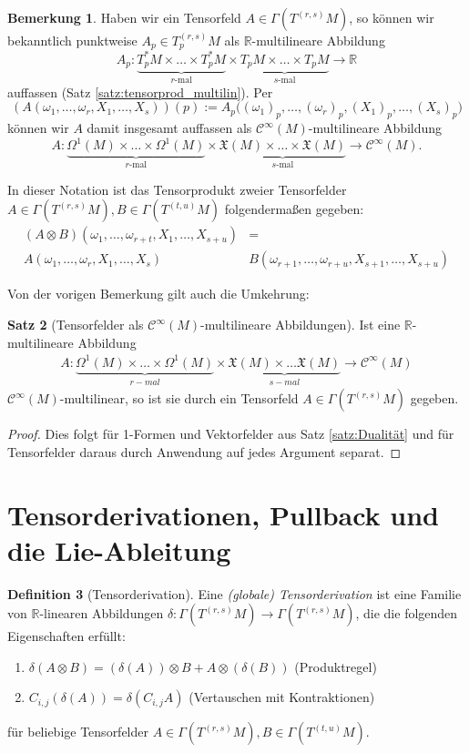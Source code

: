 \documentclass[a4paper]{scrbook}
\numberwithin{equation}{chapter}
\newcommand{\R}{\mathbb{R}}
\newcommand{\sC}{\mathcal{C}^{\infty}}
\newcommand{\vf}{\mathfrak{X}}
\theoremstyle{definition}
\newtheorem{defn}{Definition}[section]
\newtheorem{satz}[defn]{Satz}
\newtheorem{bem}[defn]{Bemerkung}
\begin{document}
		\begin{bem}\label{bem:Tensorprodukt_mulitilin}
			Haben wir ein Tensorfeld $A \in \Gamma(T^{(r,s)}M)$, so können wir bekanntlich punktweise $A_p \in T^{(r,s)}_pM$ als $\R$-multilineare Abbildung
			\[A_p\colon \underbrace{T_p^*M \times \dots \times T_p^*M}_\text{$r$-mal} \times \underbrace{T_pM \times \dots \times T_pM}_\text{$s$-mal} \to \R\]
			auffassen (Satz \ref{satz:tensorprod_multilin}). Per
			\[(A(\omega_1,\dots,\omega_r, X_1,\dots,X_s))(p) := A_p\Big((\omega_1)_p,\dots,(\omega_r)_p, (X_1)_p,\dots,(X_s)_p\Big)\]
			können wir $A$ damit insgesamt auffassen als $\sC(M)$-multilineare Abbildung
			\[A\colon \underbrace{\Omega^1(M) \times \dots \times \Omega^1(M)}_\text{$r$-mal} \times \underbrace{\vf(M) \times \dots \times \vf(M)}_\text{$s$-mal} \to \sC(M).\]
			
			In dieser Notation ist das Tensorprodukt zweier Tensorfelder $A\in\Gamma(T^{(r,s)}M), B\in \Gamma(T^{(t,u)}M)$ folgendermaßen gegeben:
			\begin{align*}
				(A\otimes B)(\omega_1,\ldots,\omega_{r+t},X_1,\ldots,X_{s+u})&=\\
				A(\omega_1,\ldots,\omega_r,X_1,\ldots,X_s) &B(\omega_{r+1},\ldots,\omega_{r+u},X_{s+1},\ldots,X_{s+u})
			\end{align*}
		\end{bem}
		Von der vorigen Bemerkung gilt auch die Umkehrung:
		\begin{satz}[Tensorfelder als $\sC(M)$-multilineare Abbildungen]
			Ist eine $\R$-multilineare Abbildung
			\begin{align*}
				A\colon \underbrace{\Omega^1(M)\times\dots\times\Omega^1(M)}_{r-mal}\times\underbrace{\vf(M)\times\dots\vf(M)}_{s-mal}\rightarrow \sC(M)
			\end{align*}
			$\sC(M)$-multilinear, so ist sie durch ein Tensorfeld $A \in \Gamma(T^{(r,s)}M)$ gegeben.
			\begin{proof}
				Dies folgt für 1-Formen und Vektorfelder aus Satz \ref{satz:Dualität} und für Tensorfelder daraus durch Anwendung \glqq auf jedes Argument separat\grqq .
			\end{proof}
		\end{satz}

	\section{Tensorderivationen, Pullback und die Lie-Ableitung}
		\begin{defn}[Tensorderivation]
			Eine \emph{(globale) Tensorderivation} ist eine Familie von $\R$-linearen Abbildungen $\delta\colon\Gamma(T^{(r,s)}M)\rightarrow \Gamma(T^{(r,s)}M)$, die die folgenden Eigenschaften erfüllt:
			\begin{enumerate}[label=(\roman*)]
				\item $\delta (A\otimes B)=(\delta(A))\otimes B+A\otimes(\delta(B))$ (Produktregel)
				\item $C_{i,j}(\delta(A))=\delta(C_{i,j}A)$ (Vertauschen mit Kontraktionen)
			\end{enumerate}
			für beliebige Tensorfelder $A\in \Gamma(T^{(r,s)}M), B\in\Gamma(T^{(t,u)}M)$.
		\end{defn}
		
\end{document}
